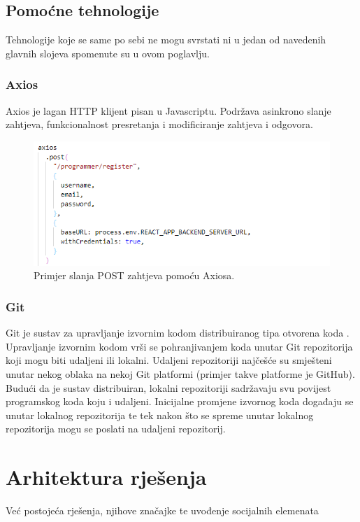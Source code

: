 \documentclass[times, utf8, zavrsni]{fer}
\begin{document}
			\section{Pomoćne tehnologije}
			Tehnologije koje se same po sebi ne mogu svrstati ni u jedan od navedenih glavnih slojeva spomenute su u ovom poglavlju.
			\subsection{Axios}
			Axios je lagan HTTP klijent pisan u Javascriptu. Podržava asinkrono slanje zahtjeva, funkcionalnost presretanja i modificiranje zahtjeva i odgovora. 
			\begin{figure}[H]
				\centering
				\includegraphics[width=\linewidth]{pictures/prikazi/Axios.png}
				\caption{Primjer slanja POST zahtjeva pomoću Axiosa.}
				\label{fig:axios}
			\end{figure}
			\subsection{Git}
			Git je sustav za upravljanje izvornim kodom distribuiranog tipa otvorena koda . Upravljanje izvornim kodom vrši se pohranjivanjem koda unutar Git repozitorija koji mogu biti udaljeni ili lokalni. Udaljeni repozitoriji  najčešće su smješteni unutar nekog oblaka  na nekoj Git platformi (primjer takve platforme je GitHub). Budući da je sustav distribuiran, lokalni repozitoriji sadržavaju svu povijest programskog koda koju i udaljeni. Inicijalne promjene izvornog koda događaju se unutar lokalnog repozitorija te tek nakon što se spreme unutar lokalnog repozitorija mogu se poslati na udaljeni repozitorij.
	
	\chapter{Arhitektura rješenja}
	Već postojeća rješenja, njihove značajke te uvođenje socijalnih elemenata
	
\end{document}
